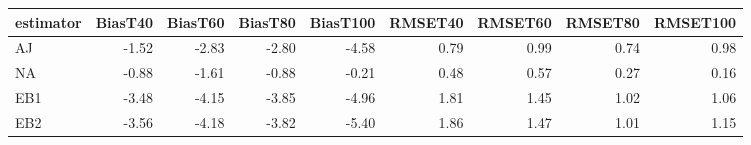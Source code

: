 \begin{table}[ht]
\centering
\begin{tabular}{lrrrrrrrr}
  \toprule
estimator & BiasT40 & BiasT60 & BiasT80 & BiasT100 & RMSET40 & RMSET60 & RMSET80 & RMSET100 \\ 
  \midrule
AJ & -1.52 & -2.83 & -2.80 & -4.58 & 0.79 & 0.99 & 0.74 & 0.98 \\ 
  NA & -0.88 & -1.61 & -0.88 & -0.21 & 0.48 & 0.57 & 0.27 & 0.16 \\ 
  EB1 & -3.48 & -4.15 & -3.85 & -4.96 & 1.81 & 1.45 & 1.02 & 1.06 \\ 
  EB2 & -3.56 & -4.18 & -3.82 & -5.40 & 1.86 & 1.47 & 1.01 & 1.15 \\ 
   \bottomrule
\end{tabular}
\end{table}
